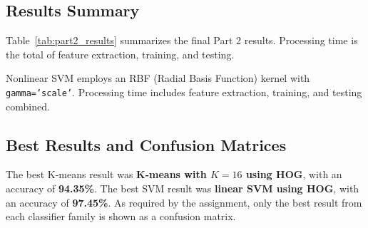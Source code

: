 \subsection{Results Summary}

Table~\ref{tab:part2_results} summarizes the final Part 2 results. Processing time is the total of feature extraction, training, and testing.

\begin{table}[H]
\centering
\caption{Part 2 comparison of features and classifiers}
\label{tab:part2_results}
\end{table}

\noindent * Nonlinear SVM employs an RBF (Radial Basis Function) kernel with \texttt{gamma='scale'}. Processing time includes feature extraction, training, and testing combined.

\subsection{Best Results and Confusion Matrices}

The best K-means result was \textbf{K-means with $K=16$ using HOG}, with an accuracy of \textbf{94.35\%}. The best SVM result was \textbf{linear SVM using HOG}, with an accuracy of \textbf{97.45\%}. As required by the assignment, only the best result from each classifier family is shown as a confusion matrix.

